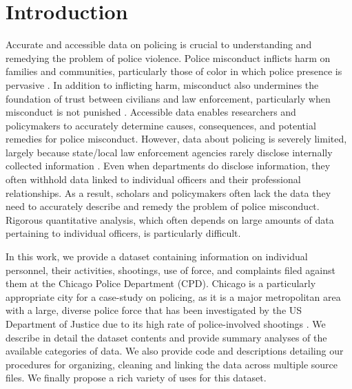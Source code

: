 

\section{Introduction} \label{sec:intro}
Accurate and accessible data on policing is crucial to understanding and
remedying the problem of police violence. Police misconduct inflicts harm on
families and communities, particularly those of color in which police presence
is pervasive \cite{Alang17}. In addition to inflicting harm, misconduct also
undermines the foundation of trust between civilians and law enforcement,
particularly when misconduct is not punished \cite{Desmond16}. Accessible data
enables researchers and policymakers to accurately determine causes,
consequences, and potential remedies for police misconduct.
However, data about policing is severely limited, largely because state/local law
enforcement agencies rarely disclose internally collected information
\cite{Jackman21}. Even when departments do disclose information, they often
withhold data linked to individual officers and their professional
relationships.  As a result, scholars and policymakers often
lack the data they need to accurately describe and remedy the problem of police
misconduct.  Rigorous quantitative analysis, which often depends on large
amounts of data pertaining to individual officers, is particularly difficult.

In this work, we provide a dataset containing information on individual
personnel, their activities, shootings, use of force, and complaints filed against them at
the Chicago Police Department (CPD). Chicago is a particularly appropriate
city for a case-study on policing, as it is a major metropolitan area with a
large, diverse police force that has been investigated by the US Department of
Justice due to its high rate of police-involved shootings \cite{DoJ17}.  We
describe in detail the dataset contents and provide summary analyses of the
available categories of data. We also provide code and descriptions detailing
our procedures for organizing, cleaning and linking the data across multiple
source files. We finally propose a rich variety of uses for this dataset.

